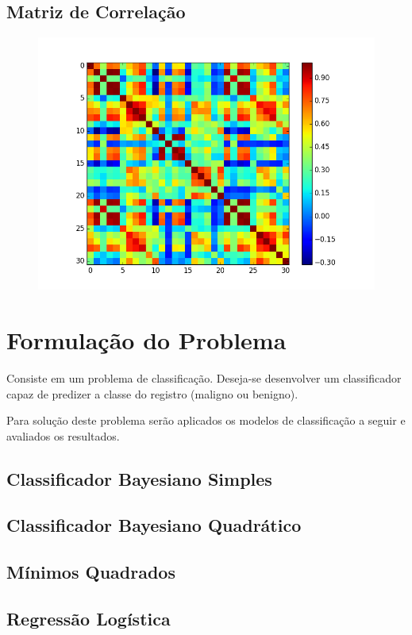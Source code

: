 \documentclass[11pt,a4paper]{article}
\numberwithin{equation}{section}
\begin{document}
\subsection{Matriz de Correlação}
\begin{figure}[H]
\centering
  \includegraphics[width=\linewidth]{./img/corrcoef.png}
  \label{fig:test1}
\end{figure}%

\section{Formulação do Problema}
Consiste em um problema de classificação. Deseja-se desenvolver um classificador capaz de predizer a classe do registro (maligno ou benigno).

Para solução deste problema serão aplicados os modelos de classificação a seguir e avaliados os resultados.
\subsection{Classificador Bayesiano Simples}
\subsection{Classificador Bayesiano Quadrático}
\subsection{Mínimos Quadrados}
\subsection{Regressão Logística}
\end{document}
